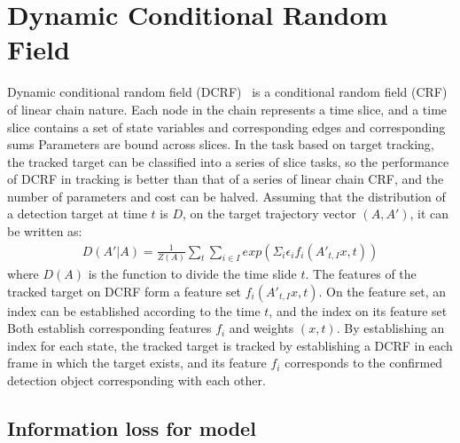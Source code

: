 \documentclass[trans]{IEEEtran}
\begin{document}
\section{Dynamic Conditional Random Field}
Dynamic conditional random field (DCRF)~\cite{sutton2004dynamic} is a conditional random field (CRF) of linear chain nature. Each node in the chain represents a time slice, and a time slice contains a set of state variables and corresponding edges and corresponding sums Parameters are bound across slices. In the task based on target tracking, the tracked target can be classified into a series of slice tasks, so the performance of DCRF in tracking is better than that of a series of linear chain CRF, and the number of parameters and cost can be halved.  Assuming that the distribution of a detection target at time $t$ is $D$, on the target trajectory vector $(A, A')$, it can be written as:
\begin{eqnarray} \label{equ:dcrfa}
D(A'|A) = \frac{1}{Z(A)} \sum_t \sum_{i\in I} exp (\Sigma_i  \epsilon_i f_i (A'_{t,I}x,t))
\end{eqnarray}
where $D(A) $ is the function to divide the time slide $t$. The features of the tracked target on DCRF form a feature set $f_i (A'_{t,I}x,t)$. On the feature set, an index can be established according to the time $t$, and the index on its feature set Both establish corresponding features $f_i $ and weights $(x,t)$. By establishing an index for each state, the tracked target is tracked by establishing a DCRF in each frame in which the target exists, and its feature $f_i $ corresponds to the confirmed detection object corresponding with each other.



\subsection{Information loss for model}
\end{document}
